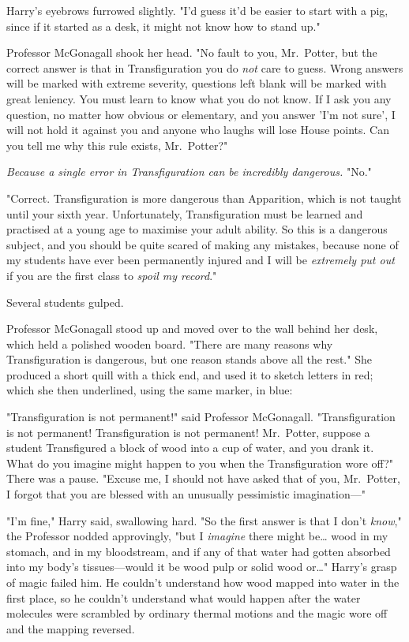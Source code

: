 Harry's eyebrows furrowed slightly. "I'd guess it'd be easier to start with a 
pig, since if it started as a desk, it might not know how to stand up."

Professor McGonagall shook her head. "No fault to you, Mr.~Potter, but the 
correct answer is that in Transfiguration you do \emph{not} care to guess. 
Wrong answers will be marked with extreme severity, questions left blank will 
be marked with great leniency. You must learn to know what you do not know. If 
I ask you any question, no matter how obvious or elementary, and you answer 
'I'm not sure', I will not hold it against you and anyone who laughs will lose 
House points. Can you tell me why this rule exists, Mr.~Potter?"

\emph{Because a single error in Transfiguration can be incredibly dangerous.} 
"No."

"Correct. Transfiguration is more dangerous than Apparition, which is not 
taught until your sixth year. Unfortunately, Transfiguration must be learned 
and practised at a young age to maximise your adult ability. So this is a 
dangerous subject, and you should be quite scared of making any mistakes, 
because none of my students have ever been permanently injured and I will be 
\emph{extremely put out} if you are the first class to\emph{ spoil my record}."

Several students gulped.

Professor McGonagall stood up and moved over to the wall behind her desk, which 
held a polished wooden board. "There are many reasons why Transfiguration is 
dangerous, but one reason stands above all the rest." She produced a short 
quill with a thick end, and used it to sketch letters in red; which she then 
underlined, using the same marker, in blue:


"Transfiguration is not permanent!" said Professor McGonagall. "Transfiguration 
is not permanent! Transfiguration is not permanent! Mr.~Potter, suppose a 
student Transfigured a block of wood into a cup of water, and you drank it. 
What do you imagine might happen to you when the Transfiguration wore off?" 
There was a pause. "Excuse me, I should not have asked that of you, Mr.~Potter, 
I forgot that you are blessed with an unusually pessimistic imagination---"

"I'm fine," Harry said, swallowing hard. "So the first answer is that I don't 
\emph{know}," the Professor nodded approvingly, "but I \emph{imagine} there 
might be{\ldots} wood in my stomach, and in my bloodstream, and if any of that 
water had gotten absorbed into my body's tissues---would it be wood pulp or 
solid wood or{\ldots}" Harry's grasp of magic failed him. He couldn't 
understand how wood mapped into water in the first place, so he couldn't 
understand what would happen after the water molecules were scrambled by 
ordinary thermal motions and the magic wore off and the mapping reversed.

